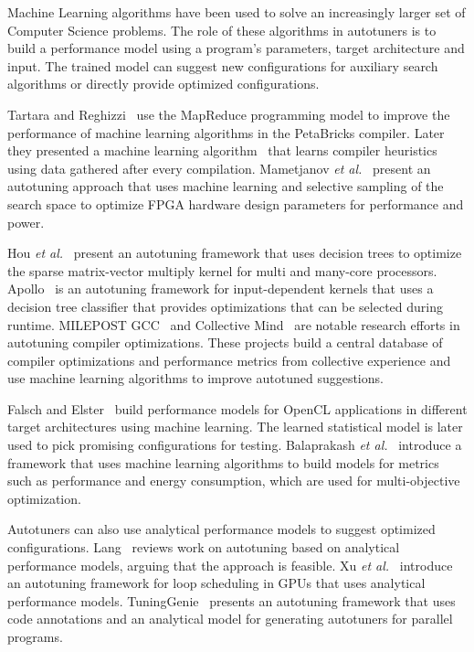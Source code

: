 Machine Learning algorithms have been used to solve an increasingly larger set
of Computer Science problems. The role of these algorithms in autotuners is to
build a performance model using a program's parameters, target architecture and
input.  The trained model can suggest new configurations for auxiliary search
algorithms or directly provide optimized configurations.

Tartara and Reghizzi~\cite{tartara2012parallel} use the MapReduce programming
model to improve the performance of machine learning algorithms in the
PetaBricks compiler. Later they presented a machine learning
algorithm~\cite{tartara2013continuous} that learns compiler heuristics using
data gathered after every compilation.  Mametjanov \emph{et
al.}~\cite{mametjanov2015autotuning} present an autotuning approach that uses
machine learning and selective sampling of the search space to optimize FPGA
hardware design parameters for performance and power.

Hou \emph{et al.}~\cite{hou2017auto} present an autotuning framework that uses
decision trees to optimize the sparse matrix-vector multiply kernel for multi
and many-core processors.  Apollo~\cite{beckingsale2017apollo} is an autotuning
framework for input-dependent kernels that uses a decision tree classifier that
provides optimizations that can be selected during runtime. MILEPOST
GCC~\cite{fursin2011milepost} and Collective Mind~\cite{fursin2015collective}
are notable research efforts in autotuning compiler optimizations.  These
projects build a central database of compiler optimizations and performance
metrics from collective experience and use machine learning algorithms to
improve autotuned suggestions.

Falsch and Elster~\cite{falch2017machine} build performance
models for OpenCL applications in different target architectures using machine
learning.  The learned statistical model is later used to pick promising
configurations for testing.  Balaprakash \emph{et
al.}~\cite{balaprakash2016automomml} introduce a framework that uses machine
learning algorithms to build models for metrics such as performance and energy
consumption, which are used for multi-objective optimization.

Autotuners can also use analytical performance models to suggest optimized
configurations.  Lang~\cite{lang2017data} reviews work on autotuning based on
analytical performance models, arguing that the approach is feasible.  Xu
\emph{et al.}~\cite{xu2016analytical} introduce an autotuning framework for
loop scheduling in GPUs that uses analytical performance models.
TuningGenie~\cite{ivanenko2014method} presents an autotuning framework that
uses code annotations and an analytical model for generating autotuners for
parallel programs.

